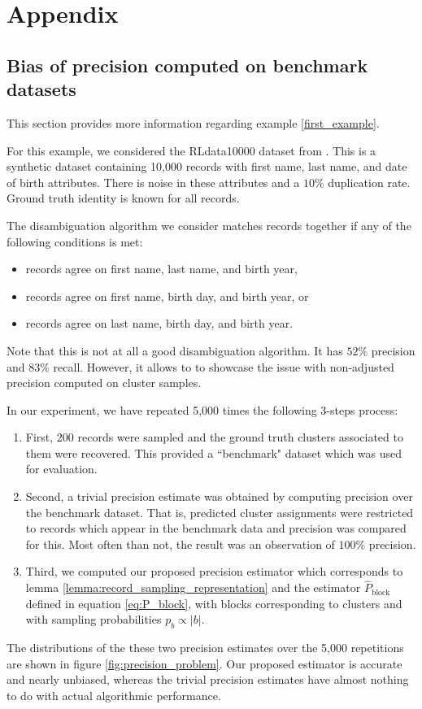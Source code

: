 \documentclass[fontsize=11pt]{article}
\theoremstyle{definition}
\begin{document}
\section{Appendix}\label{sec:appendix}

\subsection{Bias of precision computed on benchmark datasets}\label{appendix:example}

This section provides more information regarding example \ref{first_example}.

For this example, we considered the RLdata10000 dataset from \citep{RecordLinkage}. This is a synthetic dataset containing 10,000 records with first name, last name, and date of birth attributes. There is noise in these attributes and a $10\%$ duplication rate. Ground truth identity is known for all records.

The disambiguation algorithm we consider matches records together if any of the following conditions is met:
\begin{itemize}
    \item records agree on first name, last name, and birth year,
    \item records agree on first name, birth day, and birth year, or
    \item records agree on last name, birth day, and birth year.
\end{itemize}
Note that this is not at all a good disambiguation algorithm. It has $52\%$ precision and $83\%$ recall. However, it allows to to showcase the issue with non-adjusted precision computed on cluster samples.

In our experiment, we have repeated 5,000 times the following 3-steps process:
\begin{enumerate}
    \item First, 200 records were sampled and the ground truth clusters associated to them were recovered. This provided a ``benchmark" dataset which was used for evaluation.
    \item Second, a trivial precision estimate was obtained by computing precision over the benchmark dataset. That is, predicted cluster assignments were restricted to records which appear in the benchmark data and precision was compared for this. Most often than not, the result was an observation of $100\%$ precision.
    \item Third, we computed our proposed precision estimator which corresponds to lemma \ref{lemma:record_sampling_representation} and the estimator $\widehat P_{\text{block}}$ defined in equation \eqref{eq:P_block}, with blocks corresponding to clusters and with sampling probabilities $p_b \propto \lvert b \rvert$.
\end{enumerate}
The distributions of the these two precision estimates over the 5,000 repetitions are shown in figure \ref{fig:precision_problem}. Our proposed estimator is accurate and nearly unbiased, whereas the trivial precision estimates have almost nothing to do with actual algorithmic performance.
\end{document}
